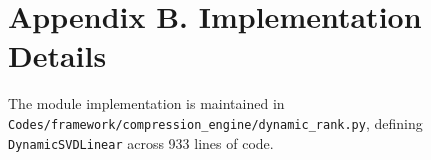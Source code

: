 \section*{Appendix B. Implementation Details}
The module implementation is maintained in \texttt{Codes/framework/compression\_engine/dynamic\_rank.py}, defining \texttt{DynamicSVDLinear} across 933 lines of code.
